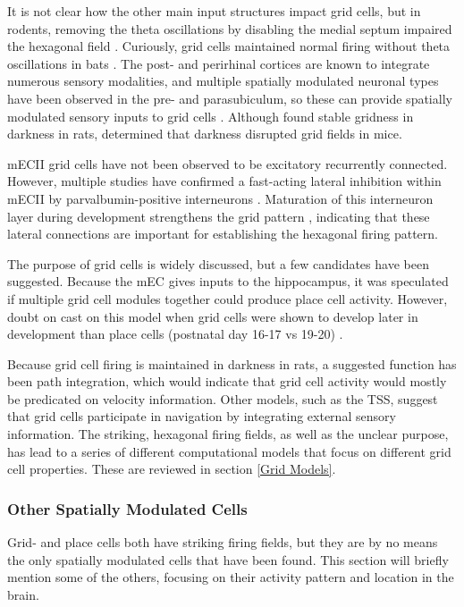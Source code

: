 \documentclass{article}
\begin{document}
    It is not clear how the other main input structures impact grid cells, but in rodents, removing the theta oscillations by disabling the medial septum impaired the hexagonal field \parencite{Brandon2011,Koenig2011}. Curiously, grid cells maintained normal firing without theta oscillations in bats \parencite{Yartsev2011}. The post- and perirhinal cortices are known to integrate numerous sensory modalities, and multiple spatially modulated neuronal types have been observed in the pre- and parasubiculum, so these can provide spatially modulated sensory inputs to grid cells \parencite{Furtak2007,Groen1990}. Although \cite{Hafting2005} found stable gridness in darkness in rats, \cite{Chen2016} determined that darkness disrupted grid fields in mice.

    mECII grid cells have not been observed to be excitatory recurrently connected. However, multiple studies have confirmed a fast-acting lateral inhibition within mECII by parvalbumin-positive interneurons \parencite{Couey2013,Buetfering2014}. Maturation of this interneuron layer during development strengthens the grid pattern \parencite{Christensen2021}, indicating that these lateral connections are important for establishing the hexagonal firing pattern.

    The purpose of grid cells is widely discussed, but a few candidates have been suggested. Because the mEC gives inputs to the hippocampus, it was speculated if multiple grid cell modules together could produce place cell activity. However, doubt on cast on this model when grid cells were shown to develop later in development than place cells (postnatal day 16-17 vs 19-20) \parencite{Langston2010,Wills2010,Wills2012}.

    Because grid cell firing is maintained in darkness in rats, a suggested function has been path integration, which would indicate that grid cell activity would mostly be predicated on velocity information. Other models, such as the TSS, suggest that grid cells participate in navigation by integrating external sensory information. The striking, hexagonal firing fields, as well as the unclear purpose, has lead to a series of different computational models that focus on different grid cell properties. These are reviewed in section \ref{Grid Models}.

    \subsubsection{Other Spatially Modulated Cells}
    Grid- and place cells both have striking firing fields, but they are by no means the only spatially modulated cells that have been found. This section will briefly mention some of the others, focusing on their activity pattern and location in the brain.
    
\end{document}
